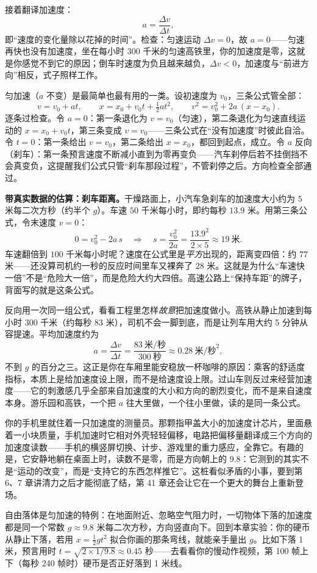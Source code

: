 \begin{mainline}
接着翻译加速度：
\[
  a=\frac{\Delta v}{\Delta t},
\]
即“速度的变化量除以花掉的时间”。检查：匀速运动 \(\Delta v=0\)，故 \(a=0\)——匀速再快也没有加速度，坐在每小时 300 千米的匀速高铁里，你的加速度是零，这就是你感觉不到它的原因；倒车时速度为负且越来越负，\(\Delta v<0\)，加速度与“前进方向”相反，式子照样工作。

匀加速（\(a\) 不变）是最简单也最有用的一类。设初速度为 \(v_0\)，三条公式管全部：
\[
  v=v_0+at,\qquad
  x=x_0+v_0 t+\tfrac12 a t^2,\qquad
  v^2=v_0^2+2a\,(x-x_0).
\]
逐条过检查。令 \(a=0\)：第一条退化为 \(v=v_0\)（匀速），第二条退化为匀速直线运动的 \(x=x_0+v_0 t\)，第三条变成 \(v=v_0\)——三条公式在“没有加速度”时彼此自洽。令 \(t=0\)：第一条给出 \(v=v_0\)，第二条给出 \(x=x_0\)，都回到起点，成立。令 \(a\) 反向（刹车）：第一条预言速度不断减小直到为零再变负——汽车刹停后若不挂倒挡不会真变负，这提醒我们公式只管“刹车那段过程”，不管刹停之后。方向检查全部通过。

\textbf{带真实数据的估算：刹车距离。}干燥路面上，小汽车急刹车的加速度大小约为 \(5\) 米每二次方秒（约半个 \(g\)）。车速 \(50\) 千米每小时，即约每秒 \(13.9\) 米。用第三条公式，令末速度 \(v=0\)：
\[
  0=v_0^2-2a\,s\quad\Rightarrow\quad s=\frac{v_0^2}{2a}=\frac{13.9^2}{2\times5}\approx 19\ \text{米}.
\]
车速翻倍到 \(100\) 千米每小时呢？速度在公式里是\emph{平方}出现的，距离变四倍：约 \(77\) 米——还没算司机约一秒的反应时间里车又裸奔了 \(28\) 米。这就是为什么“车速快一倍”不是“危险大一倍”，而是危险大约大四倍。高速公路上“保持车距”的牌子，背面写的就是这条公式。

反向用一次同一组公式，看看工程里怎样\emph{故意}把加速度做小。高铁从静止加速到每小时 300 千米（约每秒 83 米），司机不会一脚到底，而是让列车用大约 5 分钟从容提速。平均加速度约为
\[
  a=\frac{\Delta v}{\Delta t}=\frac{83\ \text{米/秒}}{300\ \text{秒}}\approx 0.28\ \text{米/秒}^2,
\]
不到 \(g\) 的百分之三。这正是你在车厢里能安稳放一杯咖啡的原因：乘客的舒适度指标，本质上是给加速度设上限，而不是给速度设上限。过山车则反过来经营加速度——它的刺激感几乎全部来自加速度的大小和方向的剧烈变化，而不是来自速度本身。游乐园和高铁，一个把 \(a\) 往大里做，一个往小里做，读的是同一条公式。

你的手机里就住着一只加速度的测量员。那颗指甲盖大小的加速度计芯片，里面悬着一小块质量，手机加速时它相对外壳轻轻偏移，电路把偏移量翻译成三个方向的加速度读数——手机的横竖屏切换、计步、游戏里的重力感应，全靠它。有趣的是，它安静地躺在桌面上时，读数不是零，而是方向朝上的 \(9.8\)：它测到的其实不是“运动的改变”，而是“支持它的东西怎样推它”。这桩看似矛盾的小事，要到第 6、7 章讲清力之后才能彻底了结，第 41 章还会让它在一个更大的舞台上重新登场。

自由落体是匀加速的特例：在地面附近、忽略空气阻力时，一切物体下落的加速度都是同一个常数 \(g\approx 9.8\) 米每二次方秒，方向竖直向下。回到本章实验：你的硬币从静止下落，若用 \(x=\tfrac12 g t^2\) 拟合你画的那条弯线，就能亲手量出 \(g\)。比如下落 1 米，预言用时 \(t=\sqrt{2\times1/9.8}\approx 0.45\) 秒——去看看你的慢动作视频，第 100 帧上下（每秒 240 帧时）硬币是否正好落到 1 米线。
\end{mainline}

